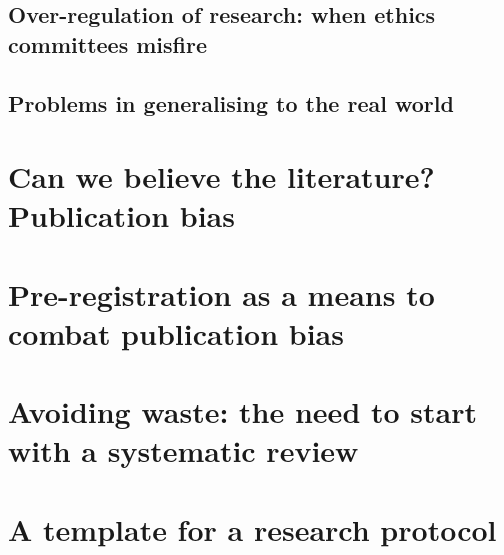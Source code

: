 \documentclass[]{book}
\begin{document}
\hypertarget{over-regulation-of-research-when-ethics-committees-misfire}{%
\section{Over-regulation of research: when ethics committees misfire}\label{over-regulation-of-research-when-ethics-committees-misfire}}

\hypertarget{problems-in-generalising-to-the-real-world}{%
\section{Problems in generalising to the real world}\label{problems-in-generalising-to-the-real-world}}

\hypertarget{can-we-believe-the-literature-publication-bias}{%
\chapter{Can we believe the literature? Publication bias}\label{can-we-believe-the-literature-publication-bias}}

\hypertarget{pre-registration-as-a-means-to-combat-publication-bias}{%
\chapter{Pre-registration as a means to combat publication bias}\label{pre-registration-as-a-means-to-combat-publication-bias}}

\hypertarget{avoiding-waste-the-need-to-start-with-a-systematic-review}{%
\chapter{Avoiding waste: the need to start with a systematic review}\label{avoiding-waste-the-need-to-start-with-a-systematic-review}}

\hypertarget{a-template-for-a-research-protocol}{%
\chapter{A template for a research protocol}\label{a-template-for-a-research-protocol}}


\end{document}
